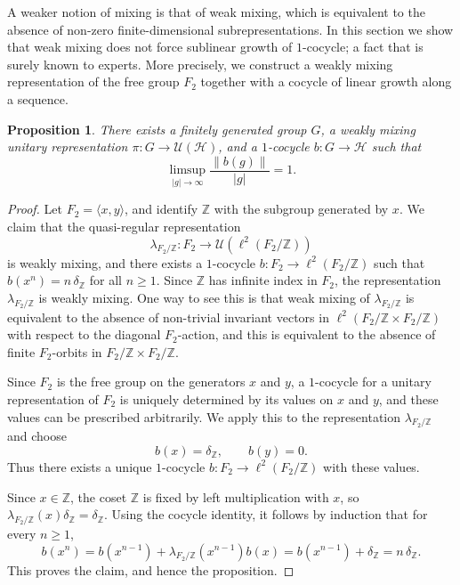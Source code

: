 \documentclass[a4paper,11pt]{amsproc}
\newtheorem{prop}[theorem]{Proposition}
\theoremstyle{remark}
\newcommand{\cH}{\mathcal H}
\begin{document}
A weaker notion of mixing is that of weak mixing, which is equivalent to the absence of non-zero finite-dimensional subrepresentations. In this section we show that weak mixing does not force sublinear growth of $1$-cocycle; a fact that is surely known to experts. More precisely, we construct a weakly mixing representation of the free group $F_2$ together with a cocycle of linear growth along a sequence.

\begin{prop}\label{prop:weak}
There exists a finitely generated group $G$, a weakly mixing unitary representation $\pi\colon G\to \mathcal U(\cH)$, and a $1$-cocycle $b\colon G\to \cH$ such that
\[
\limsup_{|g|\to\infty}\frac{\|b(g)\|}{|g|}=1.
\]
\end{prop}
\begin{proof}

Let $F_2=\langle x,y\rangle$, and identify $\mathbb Z$ with the subgroup generated by $x$. We claim that the quasi-regular representation
\[
\lambda_{F_2/\mathbb Z}\colon F_2\to \mathcal U(\ell^2(F_2/\mathbb Z))
\]
is weakly mixing, and there exists a $1$-cocycle
$
b\colon F_2\to \ell^2(F_2/\mathbb Z)
$
such that
$
b(x^n)=n\,\delta_{\mathbb Z}
$ for all $n\ge 1$.
Since $\mathbb Z$ has infinite index in $F_2$, the representation $\lambda_{F_2/\mathbb Z}$ is weakly mixing. One way to see this is that weak mixing of $\lambda_{F_2/\mathbb Z}$ is equivalent to the absence of non-trivial invariant vectors in $\ell^2(F_2/\mathbb Z \times F_2/\mathbb Z)$ with respect to the diagonal $F_2$-action, and this is equivalent to the absence of finite $F_2$-orbits in
$
F_2/\mathbb Z\times F_2/\mathbb Z.
$

Since $F_2$ is the free group on the generators $x$ and $y$, a $1$-cocycle for a unitary representation of $F_2$ is uniquely determined by its values on $x$ and $y$, and these values can be prescribed arbitrarily. We apply this to the representation $\lambda_{F_2/\mathbb Z}$ and choose
\[
b(x)=\delta_{\mathbb Z},
\qquad
b(y)=0.
\]
Thus there exists a unique $1$-cocycle
$
b\colon F_2\to \ell^2(F_2/\mathbb Z)
$
with these values.

Since $x\in \mathbb Z$, the coset $\mathbb Z$ is fixed by left multiplication with $x$, so
$
\lambda_{F_2/\mathbb Z}(x)\delta_{\mathbb Z}=\delta_{\mathbb Z}.
$
Using the cocycle identity, it follows by induction that for every $n\ge 1$,
\[
b(x^n)=b(x^{n-1})+\lambda_{F_2/\mathbb Z}(x^{n-1})b(x)=b(x^{n-1})+\delta_{\mathbb Z}=n\,\delta_{\mathbb Z}.
\]
This proves the claim, and hence the proposition.
\end{proof}
\end{document}

